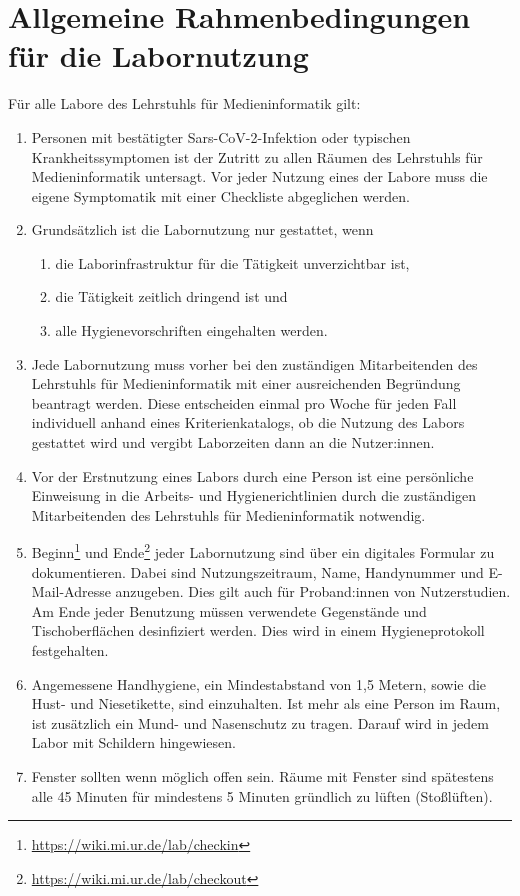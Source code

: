 \section{Allgemeine Rahmenbedingungen für die Labornutzung}\label{sec:allgemein}

\noindent
Für alle Labore des Lehrstuhls für Medieninformatik gilt:

\begin{enumerate}
    \item{Personen mit bestätigter Sars-CoV-2-Infektion oder typischen Krankheitssymptomen ist der Zutritt zu allen Räumen des Lehrstuhls für Medieninformatik untersagt. Vor jeder Nutzung eines der Labore muss die eigene Symptomatik mit einer Checkliste abgeglichen werden.}
    \item Grundsätzlich ist die Labornutzung nur gestattet, wenn
    \begin{enumerate}
        \item die Laborinfrastruktur für die Tätigkeit unverzichtbar ist,
        \item die Tätigkeit zeitlich dringend ist und 
        \item alle Hygienevorschriften eingehalten werden.
    \end{enumerate}
    \item{Jede Labornutzung muss vorher bei den zuständigen Mitarbeitenden des Lehrstuhls für Medieninformatik mit einer ausreichenden Begründung beantragt werden. Diese entscheiden einmal pro Woche für jeden Fall individuell anhand eines Kriterienkatalogs, ob die Nutzung des Labors gestattet wird und vergibt Laborzeiten dann an die Nutzer:innen.}
    \item{Vor der Erstnutzung eines Labors durch eine Person ist eine persönliche Einweisung in die Arbeits- und Hygienerichtlinien durch die zuständigen Mitarbeitenden des Lehrstuhls für Medieninformatik notwendig.}
    \item{Beginn\footnote{\url{https://wiki.mi.ur.de/lab/checkin}} und Ende\footnote{\url{https://wiki.mi.ur.de/lab/checkout}} jeder Labornutzung sind über ein digitales Formular zu dokumentieren.
    Dabei sind Nutzungszeitraum, Name, Handynummer und E-Mail-Adresse anzugeben.
    Dies gilt auch für Proband:innen von Nutzerstudien.
    Am Ende jeder Benutzung müssen verwendete Gegenstände und Tischoberflächen desinfiziert werden.
    Dies wird in einem Hygieneprotokoll festgehalten.}
    \item{Angemessene Handhygiene, ein Mindestabstand von 1,5 Metern, sowie die Hust- und Niesetikette, sind einzuhalten.
    Ist mehr als eine Person im Raum, ist zusätzlich ein Mund- und Nasenschutz zu tragen.
    Darauf wird in jedem Labor mit Schildern hingewiesen.}
    \item{Fenster sollten wenn möglich offen sein. Räume mit Fenster sind spätestens alle 45 Minuten für mindestens 5 Minuten gründlich zu lüften (Stoßlüften).}
\end{enumerate}
